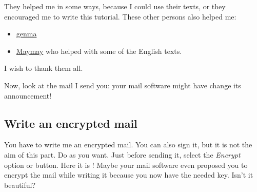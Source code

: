 They helped me in some ways, because I could use their texts, or they encouraged me to write this tutorial. These other persons also helped me:

\begin{itemize}
\itemsep1pt\parskip0pt
\item
  \href{http://genma.free.fr/}{genma}
\item
  \href{https://maymay.net/}{Maymay} who helped with some of the English
  texts.
\end{itemize}

I wish to thank them all.

Now, look at the mail I send you: your mail software might have change its announcement!

\subsection{Write an encrypted mail}\label{write-an-encrypted-mail}

You have to write me an encrypted mail. You can also sign it, but it is not the aim of this part. Do as you want.
Just before sending it, select the \emph{Encrypt} option or button. Here it is !
Maybe your mail software even proposed you to encrypt the mail while writing it because you now have the needed key.
Isn't it beautiful?